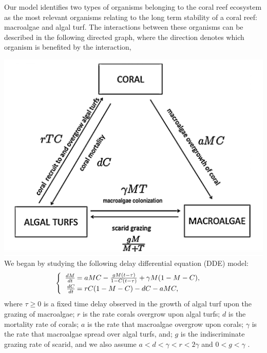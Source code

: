 Our model identifies two types of organisms belonging to the coral reef ecosystem as the most relevant organisms relating to the long term stability of a coral reef: macroalgae and algal turf. The interactions between these organisms can be described in the following directed graph, where the direction denotes which organism is benefited by the interaction,


\hspace{1.5em} \includegraphics[scale=.125]{coral-reef-triangle.png}\\

We began by studying the following delay differential equation (DDE) model:
$$\begin{cases}
  \begin{array}{rl}
    \frac{dM}{dt}\hspace{-.8em}&=aMC - \frac{gM(t-\tau)}{1-C(t-\tau)} + \gamma M (1-M-C),\\
    \frac{dC}{dt}\hspace{-.8em}&=rC(1-M-C) - dC - aMC,
  \end{array}
\end{cases}$$ where  $\tau\geq0$ is a fixed time delay observed in the growth of algal turf upon the grazing of macroalgae; 
$r$ is the rate corals overgrow upon algal turfs; 
$d$ is the mortality rate of corals; 
$a$ is the rate that macroalgae overgrow upon corals; 
$\gamma$ is the rate that macroalgae spread over algal turfs, and; 
$g$ is the indiscriminate grazing rate of scarid,
and we also assume $a<d<\gamma<r<2\gamma$ and $0<g<\gamma$ \cite{Hastings}. 

